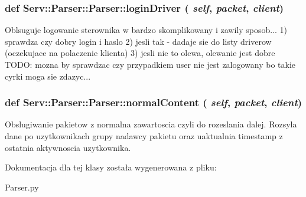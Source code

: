  \hypertarget{class_serv_1_1_parser_1_1_parser_ae092cef5abd35ec04fa61e71377e1303}{
\subsubsection[{loginDriver}]{\setlength{\rightskip}{0pt plus 5cm}def Serv::Parser::Parser::loginDriver ( {\em self}, \/   {\em packet}, \/   {\em client})}}
\label{class_serv_1_1_parser_1_1_parser_ae092cef5abd35ec04fa61e71377e1303}
\begin{DoxyVerb}Oblsuguje logowanie sterownika w bardzo skomplikowany i zawily sposob...
1) sprawdza czy dobry login i haslo
2) jesli tak - dadaje sie do listy driverow (oczekujace na polaczenie klienta)
3) jesli nie to olewa, olewanie jest dobre
TODO: mozna by sprawdzac czy przypadkiem user nie jest zalogowany bo takie cyrki moga sie zdazyc...        
\end{DoxyVerb}
 \hypertarget{class_serv_1_1_parser_1_1_parser_adc1da4d6ff7eb9dbc114f8a426274aa0}{
\subsubsection[{normalContent}]{\setlength{\rightskip}{0pt plus 5cm}def Serv::Parser::Parser::normalContent ( {\em self}, \/   {\em packet}, \/   {\em client})}}
\label{class_serv_1_1_parser_1_1_parser_adc1da4d6ff7eb9dbc114f8a426274aa0}
\begin{DoxyVerb}Obslugiwanie pakietow z normalna zawartoscia czyli do rozeslania dalej.
Rozsyla dane po uzytkownikach grupy nadawcy pakietu oraz uaktualnia timestamp z ostatnia aktywnoscia uzytkownika.         
\end{DoxyVerb}
 

Dokumentacja dla tej klasy została wygenerowana z pliku:\begin{DoxyCompactItemize}
\item 
Parser.py\end{DoxyCompactItemize}

